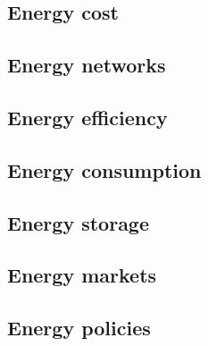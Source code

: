 \documentclass[../summary.tex]{subfiles}
\begin{document}
	\subsection{Energy cost}
	\subsection{Energy networks}
	\subsection{Energy efficiency}
	\subsection{Energy consumption}
	\subsection{Energy storage}
	\subsection{Energy markets}
	\subsection{Energy policies}
	
\end{document}
